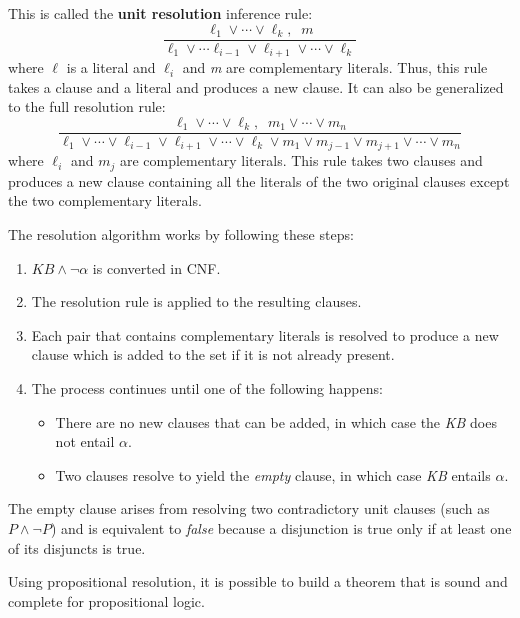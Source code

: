 \documentclass{article}
\begin{document}
This is called the \textbf{unit resolution} inference rule:
\[\frac{\ell_1 \vee \cdots \vee \ell_k,\;\; m}{\ell_1\vee \cdots \ell_{i-1}\vee\ell_{i+1}\vee \cdots \vee \ell_k}\]
where \(\ell\) is a literal and \(\ell_i\) and \textit{m} are complementary literals. Thus, this rule takes a clause and a literal and produces a new clause. It can also be generalized to the full resolution rule:
\[\frac{\ell_1\vee\cdots\vee\ell_k,\;\; m_1\vee\cdots\vee m_n}{\ell_1\vee\cdots\vee\ell_{i-1}\vee\ell_{i+1}\vee\cdots\vee\ell_k\vee m_1 \vee m_{j-1}\vee m_{j+1}\vee\cdots\vee m_n}\]
where \(\ell_i\) and \(m_j\) are complementary literals. This rule takes two clauses and produces a new clause containing all the literals of the two original clauses except the two complementary literals.

The resolution algorithm works by following these steps:
\begin{enumerate}
    \item \(KB \land \neg \alpha\) is converted in CNF.
    \item The resolution rule is applied to the resulting clauses.
    \item Each pair that contains complementary literals is resolved to produce a new clause which is added to the set if it is not already present.
    \item The process continues until one of the following happens:
    \begin{itemize}
        \item There are no new clauses that can be added, in which case the \textit{KB} does not entail \(\alpha\).
        \item Two clauses resolve to yield the \textit{empty} clause, in which case \textit{KB} entails \(\alpha\).
    \end{itemize}
\end{enumerate}

The empty clause arises from resolving two contradictory unit clauses (such as \(P \land \neg P\)) and is equivalent to \textit{false} because a disjunction is true only if at least one of its disjuncts is true.

Using propositional resolution, it is possible to build a theorem that is sound and complete for propositional logic.
\end{document}
